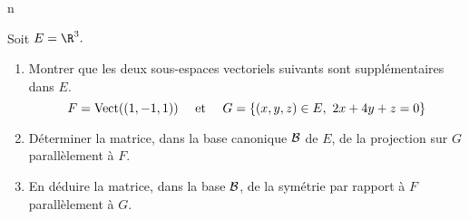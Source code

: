 n\documentclass[a4paper,10pt]{report}
\begin{document}
\begin{Exercice}{} Soit $E=\R^3.$

\begin{enumerate}

\item Montrer que les deux sous-espaces vectoriels suivants sont
suppl\'ementaires dans $E.$
$$F=\hbox{Vect}((1,-1,1))\quad\hbox{ et }\quad G=\{(x,y,z)\in
E,\ 2x+4y+z=0\}$$

\item D\'eterminer la matrice, dans la base canonique ${\cal B}$
de $E$, de la projection sur $G$ parallèlement à $F.$

\item En d\'eduire la matrice, dans la base ${\cal B}$, de la
sym\'etrie par rapport \`a $F$ parallèlement à $G.$
\end{enumerate}
\end{Exercice} 

\corr 
\end{document}
